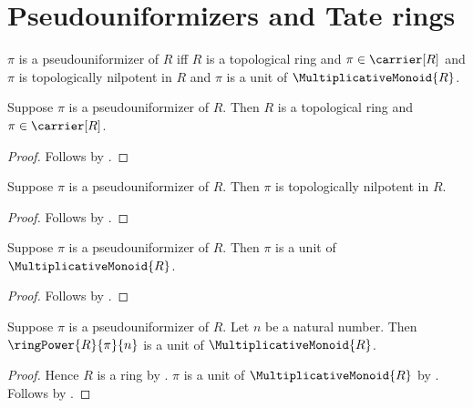 


\section{Pseudouniformizers and Tate rings}

\begin{definition}\label{pseudouniformizer}
    $\pi$ is a pseudouniformizer of $R$ iff
        $R$ is a topological ring and $\pi\in\carrier[R]$ and
        $\pi$ is topologically nilpotent in $R$ and
        $\pi$ is a unit of $\MultiplicativeMonoid{R}$.
\end{definition}

\begin{proposition}\label{pseudouniformizer_ambient}
    Suppose $\pi$ is a pseudouniformizer of $R$.
    Then $R$ is a topological ring and $\pi\in\carrier[R]$.
\end{proposition}
\begin{proof}
    Follows by .
\end{proof}

\begin{proposition}\label{pseudouniformizer_is_topologically_nilpotent}
    Suppose $\pi$ is a pseudouniformizer of $R$.
    Then $\pi$ is topologically nilpotent in $R$.
\end{proposition}
\begin{proof}
    Follows by .
\end{proof}

\begin{proposition}\label{pseudouniformizer_is_unit}
    Suppose $\pi$ is a pseudouniformizer of $R$.
    Then $\pi$ is a unit of $\MultiplicativeMonoid{R}$.
\end{proposition}
\begin{proof}
    Follows by .
\end{proof}

\begin{proposition}\label{pseudouniformizer_power_is_unit}
    Suppose $\pi$ is a pseudouniformizer of $R$.
    Let $n$ be a natural number.
    Then $\ringPower{R}{\pi}{n}$ is a unit of
        $\MultiplicativeMonoid{R}$.
\end{proposition}
\begin{proof}
    Hence $R$ is a ring by .
    $\pi$ is a unit of $\MultiplicativeMonoid{R}$ by
        .
    Follows by .
\end{proof}

